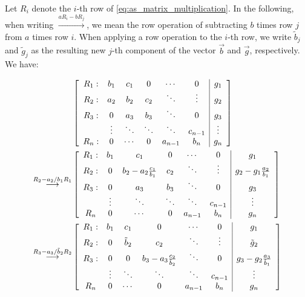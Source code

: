 \documentclass[english,notitlepage,reprint,nofootinbib]{revtex4-2}  %
\begin{document}
Let $R_{i}$ denote the $i$-th row of \eqref{eq:as_matrix_multiplication}. In the following, when writing $\overset{aR_i-b R_j}{\rightarrow}$, we mean the row operation of subtracting $b$ times row \(j\) from \(a\) times row \(i\). When applying a row operation to the $i$-th row, we write \(\tilde{b}_{j}\) and \(\tilde{g}_j\) as the resulting new \(j\)-th component of the vector \(\vec{b}\) and \(\vec{g}\), respectively. We have:
\begin{widetext}
\begin{align}
    &\left[\begin{array}{cccccc|c}
        R_1: & b_1 & c_1 & 0 & \cdots & 0  & g_1\\
        R_2: & a_{2} & b_2 & c_2 & \ddots & \vdots  & g_2\\
        R_3: & 0 & a_{3} & b_3 & \ddots & 0  & g_3\\
        \ & \vdots & \ddots & \ddots & \ddots & c_{n-1}  & \vdots\\
        R_{n}: & 0 & \cdots & 0 & a_{n-1} & b_{n} & g_{n}
    \end{array}\right]
    \notag \\
    \overset{R_2 - a_2/b_1R_1}{\longrightarrow} 
    &\left[\begin{array}{cccccc|c}
        R_1: & b_1 & c_1 & 0 & \cdots & 0  & g_1\\
        R_2: & 0 & b_2-a_2\frac{c_1}{b_1} & c_2 & \ddots & \vdots  & g_2-g_1\frac{a_2}{b_1}\\
        R_3: & 0 & a_{3} & b_3 & \ddots & 0  & g_3\\
        \ & \vdots & \ddots & \ddots & \ddots & c_{n-1}  & \vdots\\
        R_{n} & 0 & \cdots & 0 & a_{n-1} & b_{n} & g_{n}
    \end{array}\right]
    \notag \\
    \overset{R_3 - a_3/\tilde{b}_2R_2}{\longrightarrow} 
    &\left[\begin{array}{cccccc|c}
        R_1: & b_1 & c_1 & 0 & \cdots & 0  & g_1\\
        R_2: & 0 & \tilde{b}_2 & c_2 & \ddots & \vdots  & \tilde{g}_2\\
        R_3: & 0 & 0 & b_3 - a_{3}\frac{c_2}{\tilde{b}_2} & \ddots & 0  & g_3 - g_2\frac{a_3}{\tilde{b}_1}\\
        \ & \vdots & \ddots & \ddots & \ddots & c_{n-1}  & \vdots\\
        R_{n} & 0 & \cdots & 0 & a_{n-1} & b_{n} & g_{n}
    \end{array}\right]

\end{align}
\end{widetext}
\end{document}
